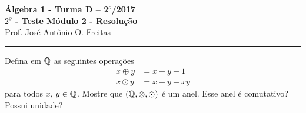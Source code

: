 \documentclass[12pt]{article}
\begin{document}


\begin{center}
{\Large\bf {\'A}lgebra 1 - Turma D -- 2$^{o}$/2017} \\ \vspace{9pt} {\large\bf
  $2^{\underline{o}}$ - Teste Módulo 2 - Resolu\c{c}\~ao}\\
\vspace{9pt} Prof. Jos{\'e} Ant{\^o}nio O. Freitas
\end{center}
\hrule

\vspace{.6cm}

\questao Defina em $\mathbb{Q}$ as seguintes operações
\begin{align*}
	x \oplus y &= x + y - 1\\
	x \odot y &= x + y - xy
\end{align*}
para todos $x$, $y \in \mathbb{Q}$. Mostre que $(\mathbb{Q}, \otimes, \odot)$ é um anel. Esse anel é comutativo? Possui unidade?
\end{document}
